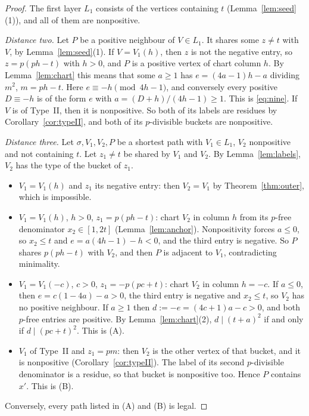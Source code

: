 \documentclass[11pt,reqno]{amsart}
\theoremstyle{definition}
\begin{document}
\begin{proof}
The first layer $L_1$ consists of the vertices containing $t$
(Lemma~\ref{lem:seed}(1)), and all of them are nonpositive.

\emph{Distance two.}  Let $P$ be a positive neighbour of $V\in L_1$.  It
shares some $z\ne t$ with $V$, by Lemma~\ref{lem:seed}(1).  If
$V=V_1(h)$, then $z$ is not the negative entry, so $z=p(ph-t)$ with $h>0$,
and $P$ is a positive vertex of chart column $h$.  By
Lemma~\ref{lem:chart} this means that some $a\ge1$ has $e=(4a-1)h-a$
dividing $m^2$, $m=ph-t$.  Here $e\equiv-h\pmod{4h-1}$, and conversely
every positive $D\equiv-h$ is of the form $e$ with
$a=(D+h)/(4h-1)\ge1$.  This is \eqref{eq:nine}.  If $V$ is of Type~II, then
it is nonpositive.  So both of its labels are residues by
Corollary~\ref{cor:typeII}, and both of its $p$-divisible buckets are
nonpositive.

\emph{Distance three.}  Let $\sigma,V_1,V_2,P$ be a shortest path with
$V_1\in L_1$, $V_2$ nonpositive and not containing $t$.  Let
$z_1\ne t$ be shared by $V_1$ and $V_2$.  By Lemma~\ref{lem:labels},
$V_2$ has the type of the bucket of $z_1$.
\begin{itemize}
\item $V_1=V_1(h)$ and $z_1$ its negative entry: then $V_2=V_1$ by
Theorem~\ref{thm:outer}, which is impossible.
\item $V_1=V_1(h)$, $h>0$, $z_1=p(ph-t)$: chart $V_2$ in column $h$ from
its $p$-free denominator $x_2\in[1,2t]$ (Lemma~\ref{lem:anchor}).
Nonpositivity forces $a\le0$, so $x_2\le t$ and
$e=a(4h-1)-h<0$, and the third entry is negative.  So $P$ shares
$p(ph-t)$ with $V_2$, and then $P$ is adjacent to $V_1$, contradicting
minimality.
\item $V_1=V_1(-c)$, $c>0$, $z_1=-p(pc+t)$: chart $V_2$ in column $h=-c$.
If $a\le0$, then $e=c(1-4a)-a>0$, the third entry is negative and
$x_2\le t$, so $V_2$ has no positive neighbour.  If $a\ge1$ then
$d:=-e=(4c+1)a-c>0$, and both $p$-free entries are positive.  By
Lemma~\ref{lem:chart}(2), $d\mid(t+a)^2$ if and only if $d\mid(pc+t)^2$.
This is (A).
\item $V_1$ of Type~II and $z_1=pm$: then $V_2$ is the other vertex of that
bucket, and it is nonpositive (Corollary~\ref{cor:typeII}).  The label of
its second $p$-divisible denominator is a residue, so that bucket is
nonpositive too.  Hence $P$ contains $x'$.  This is (B).
\end{itemize}
Conversely, every path listed in (A) and (B) is legal.
\end{proof}
\end{document}
